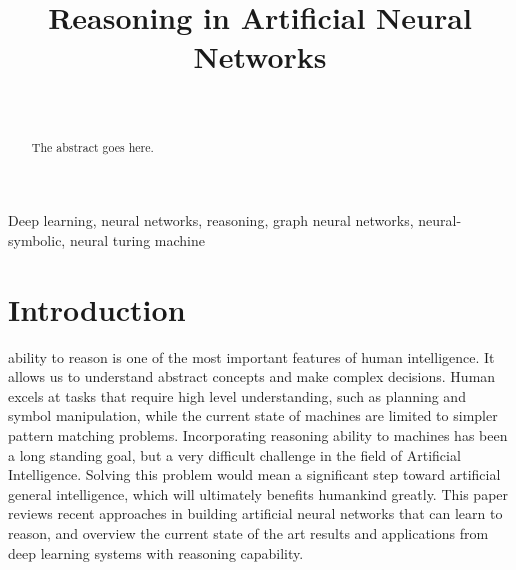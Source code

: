 \documentclass[journal]{IEEEtran}
\begin{document}
\title{Reasoning in Artificial Neural Networks}

\author{%
  \\
}

\maketitle


\begin{abstract}
The abstract goes here.
\end{abstract}


\begin{IEEEkeywords}
Deep learning, neural networks, reasoning, graph neural networks, neural-symbolic, neural turing machine
\end{IEEEkeywords}



\section{Introduction}

 ability to reason is one of the most important features of human intelligence. 
It allows us to understand abstract concepts and make complex decisions.
Human excels at tasks that require high level understanding, such as planning and symbol manipulation, 
while the current state of machines are limited to simpler pattern matching problems.
Incorporating reasoning ability to machines has been a long standing goal, but a very difficult challenge in the field of Artificial Intelligence. 
Solving this problem would mean a significant step toward artificial general intelligence, which will ultimately benefits humankind greatly. 
This paper reviews recent approaches in building artificial neural networks that can learn to reason, 
and overview the current state of the art results and applications from deep learning systems with reasoning capability.
\end{document}

